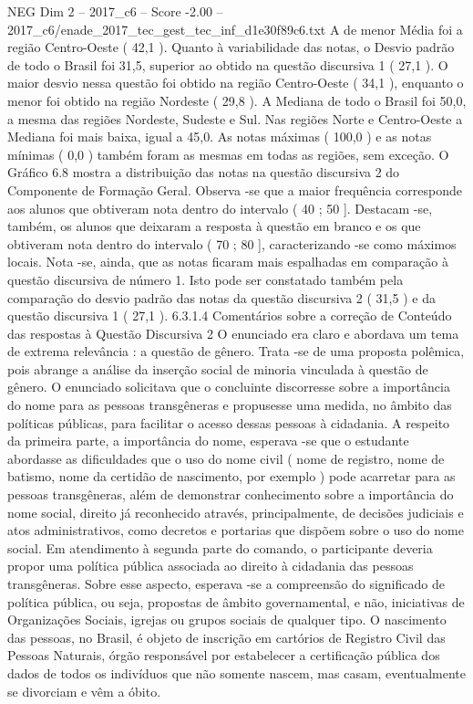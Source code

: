 \begin{textsample}{NEG Dim 2 – 2017\_c6 – Score -2.00 – 2017\_c6/enade\_2017\_tec\_gest\_tec\_inf\_d1e30f89c6.txt}
A de menor Média foi a região Centro-Oeste ( 42,1 ).
Quanto à variabilidade das notas, o Desvio padrão de todo o Brasil foi 31,5, superior ao obtido na questão discursiva 1 ( 27,1 ).
O maior desvio nessa questão foi obtido na região Centro-Oeste ( 34,1 ), enquanto o menor foi obtido na região Nordeste ( 29,8 ).
A Mediana de todo o Brasil foi 50,0, a mesma das regiões Nordeste, Sudeste e Sul.
Nas regiões Norte e Centro-Oeste a Mediana foi mais baixa, igual a 45,0.
As notas máximas ( 100,0 ) e as notas mínimas ( 0,0 ) também foram as mesmas em todas as regiões, sem exceção.
O Gráfico 6.8 mostra a distribuição das notas na questão discursiva 2 do Componente de Formação Geral.
Observa -se que a maior frequência corresponde aos alunos que obtiveram nota dentro do intervalo ( 40 ; 50 ].
Destacam -se, também, os alunos que deixaram a resposta à questão em branco e os que obtiveram nota dentro do intervalo ( 70 ; 80 ], caracterizando -se como máximos locais.
Nota -se, ainda, que as notas ficaram mais espalhadas em comparação à questão discursiva de número 1.
Isto pode ser constatado também pela comparação do desvio padrão das notas da questão discursiva 2 ( 31,5 ) e da questão discursiva 1 ( 27,1 ). 6.3.1.4 Comentários sobre a correção de Conteúdo das respostas à Questão Discursiva 2 O enunciado era claro e abordava um tema de extrema relevância : a questão de gênero.
Trata -se de uma proposta polêmica, pois abrange a análise da inserção social de minoria vinculada à questão de gênero.
O enunciado solicitava que o concluinte discorresse sobre a importância do nome para as pessoas transgêneras e propusesse uma medida, no âmbito das políticas públicas, para facilitar o acesso dessas pessoas à cidadania.
A respeito da primeira parte, a importância do nome, esperava -se que o estudante abordasse as dificuldades que o uso do nome civil ( nome de registro, nome de batismo, nome da certidão de nascimento, por exemplo ) pode acarretar para as pessoas transgêneras, além de demonstrar conhecimento sobre a importância do nome social, direito já reconhecido através, principalmente, de decisões judiciais e atos administrativos, como decretos e portarias que dispõem sobre o uso do nome social.
Em atendimento à segunda parte do comando, o participante deveria propor uma política pública associada ao direito à cidadania das pessoas transgêneras.
Sobre esse aspecto, esperava -se a compreensão do significado de política pública, ou seja, propostas de âmbito governamental, e não, iniciativas de Organizações Sociais, igrejas ou grupos sociais de qualquer tipo.
O nascimento das pessoas, no Brasil, é objeto de inscrição em cartórios de Registro Civil das Pessoas Naturais, órgão responsável por estabelecer a certificação pública dos dados de todos os indivíduos que não somente nascem, mas casam, eventualmente se divorciam e vêm a óbito.

\end{textsample}
